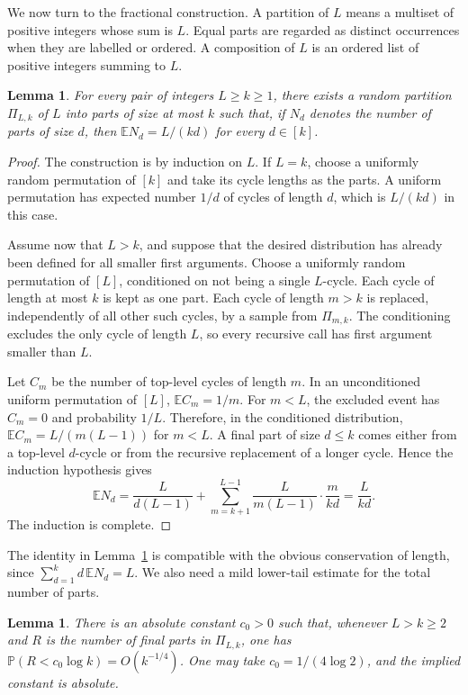 \documentclass[10pt,a4paper]{amsart}
\numberwithin{equation}{section}
\newtheorem{lemma}[theorem]{Lemma}
\newcommand{\E}{\mathbb{E}}
\newcommand{\Prob}{\mathbb{P}}
\begin{document}
We now turn to the fractional construction.  A partition of $L$ means a
multiset of positive integers whose sum is $L$.  Equal parts are regarded as
distinct occurrences when they are labelled or ordered.  A composition of $L$
is an ordered list of positive integers summing to $L$.

\begin{lemma}\label{lem:harmonic-partition}
For every pair of integers $L\ge k\ge1$, there exists a random partition
$\Pi_{L,k}$ of $L$ into parts of size at most $k$ such that, if $N_d$ denotes
the number of parts of size $d$, then $\E N_d=L/(kd)$ for every $d\in[k]$.
\end{lemma}

\begin{proof}
The construction is by induction on $L$.  If $L=k$, choose a uniformly random
permutation of $[k]$ and take its cycle lengths as the parts.  A uniform
permutation has expected number $1/d$ of cycles of length $d$, which is
$L/(kd)$ in this case.

Assume now that $L>k$, and suppose that the desired distribution has already
been defined for all smaller first arguments.  Choose a uniformly random
permutation of $[L]$, conditioned on not being a single $L$-cycle.  Each
cycle of length at most $k$ is kept as one part.  Each cycle of length
$m>k$ is replaced, independently of all other such cycles, by a sample from
$\Pi_{m,k}$.  The conditioning excludes the only cycle of length $L$, so every
recursive call has first argument smaller than $L$.

Let $C_m$ be the number of top-level cycles of length $m$.  In an
unconditioned uniform permutation of $[L]$, $\E C_m=1/m$.  For $m<L$, the
excluded event has $C_m=0$ and probability $1/L$.  Therefore, in the
conditioned distribution, $\E C_m=L/(m(L-1))$ for $m<L$.  A final part of size
$d\le k$ comes either from a top-level $d$-cycle or from the recursive
replacement of a longer cycle.  Hence the induction hypothesis gives
\[
 \E N_d
 =\frac{L}{d(L-1)}
   +\sum_{m=k+1}^{L-1}\frac{L}{m(L-1)}\cdot\frac{m}{kd}
 =\frac{L}{kd}.
\]
The induction is complete.
\end{proof}

The identity in Lemma~\ref{lem:harmonic-partition} is compatible with the
obvious conservation of length, since $\sum_{d=1}^k d\,\E N_d=L$.  We also
need a mild lower-tail estimate for the total number of parts.

\begin{lemma}\label{lem:many-parts}
There is an absolute constant $c_0>0$ such that, whenever $L>k\ge2$ and $R$
is the number of final parts in $\Pi_{L,k}$, one has
$\Prob(R<c_0\log k)=O(k^{-1/4})$.  One may take $c_0=1/(4\log2)$, and the
implied constant is absolute.
\end{lemma}
\end{document}
